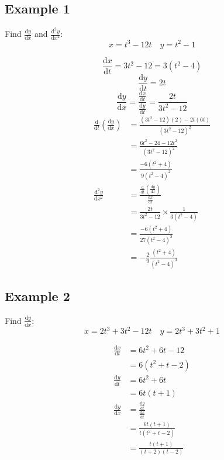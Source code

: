 \documentclass[letterpaper, 12pt]{article}
\newcommand*{\diff}{\mathrm{d}}
\newcommand*{\Diff}[1]{\mathrm{d^#1}}
\begin{document}
\subsection*{Example 1}
Find \( \frac{\diff{y}}{\diff{x}} \) and \( \frac{\Diff{2}{y}}{\diff{x}^{2}} \):
\[ x = t^{3}-12t \quad y = t^{2}-1 \]
\begin{center}
\end{center}
\[ \frac{\diff{x}}{\diff{t}} = 3t^{2}-12 = 3(t^{2}-4) \]
\[ \frac{\diff{y}}{\diff{t}} = 2t \]
\[ \frac{\diff{y}}{\diff{x}} =
   \frac{\frac{\diff{x}}{\diff{t}}}{\frac{\diff{y}}{\diff{t}}} =
   \frac{2t}{3t^{2}-12} \]
\begin{align*}
  \frac{\diff}{\diff{t}}(\frac{\diff{y}}{\diff{x}}) &=
    \frac{(3t^{2}-12)(2)-2t(6t)}{(3t^{2}-12)^{2}} \\
  &= \frac{6t^{2}-24-12t^{2}}{(3t^{2}-12)^{2}} \\
  &= \frac{-6(t^{2}+4)}{9(t^{2}-4)^{2}} \\
  \frac{\Diff{2}{y}}{\diff{x}^{2}} &=
    \frac{\frac{\diff}{\diff{t}}(\frac{\diff{y}}{\diff{x}})}
      {\frac{\diff{x}}{\diff{t}}} \\
  &= \frac{2t}{3t^{2}-12}\times\frac{1}{3(t^{2}-4)} \\
  &= \frac{-6(t^{2}+4)}{27(t^{2}-4)^{3}} \\
  &= -\frac{2}{9}\frac{(t^{2}+4)}{(t^{2}-4)^{3}}
\end{align*}

\subsection*{Example 2}
Find \( \frac{\diff{y}}{\diff{x}} \):
\[ x = 2t^{3}+3t^{2}-12t \quad y = 2t^{3}+3t^{2}+1 \]
\begin{center}
\end{center}
\begin{align*}
  \frac{\diff{x}}{\diff{t}} &= 6t^{2}+6t-12 \\
  &= 6(t^{2}+t-2) \\
  \frac{\diff{y}}{\diff{t}} &= 6t^{2}+6t \\
  &= 6t(t+1) \\
  \frac{\diff{y}}{\diff{x}} &=
    \frac{\frac{\diff{y}}{\diff{t}}}{\frac{\diff{x}}{\diff{t}}} \\
  &= \frac{6t(t+1)}{t(t^{2}+t-2)} \\
  &= \frac{t(t+1)}{(t+2)(t-2)}
\end{align*}
\end{document}
